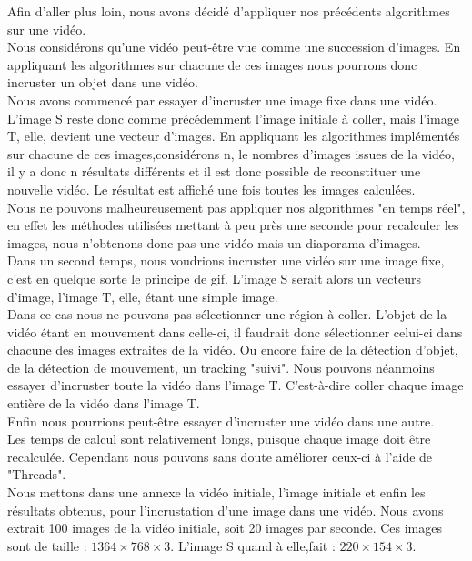 Afin d'aller plus loin, nous avons décidé d'appliquer nos précédents algorithmes sur une vidéo. \\
Nous considérons qu'une vidéo peut-être vue comme une succession d'images. En appliquant les algorithmes sur chacune de ces images nous pourrons donc incruster un objet dans une vidéo. \\
Nous avons commencé par essayer d'incruster une image fixe dans une vidéo. 
L'image S reste donc comme précédemment l'image initiale à coller, mais l'image T, elle, devient une vecteur d'images. En appliquant les algorithmes implémentés sur chacune de ces images,considérons n, le nombres d'images issues de la vidéo, il y a donc n résultats différents et il est donc possible de reconstituer une nouvelle vidéo.  Le résultat est affiché une fois toutes les images calculées. \\ Nous ne pouvons malheureusement pas appliquer nos algorithmes "en temps réel", en effet les méthodes utilisées mettant à peu près une seconde pour recalculer les images, nous n'obtenons donc pas une vidéo mais un diaporama d'images. \\
Dans un second temps, nous voudrions incruster une vidéo sur une image fixe, c'est en quelque sorte le principe de gif. L'image S serait alors un vecteurs d'image, l'image T, elle, étant une simple image. \\ Dans ce cas nous ne pouvons pas sélectionner une région à coller. L'objet de la vidéo étant en mouvement dans celle-ci, il faudrait donc sélectionner celui-ci dans chacune des images extraites de la vidéo. Ou encore faire de la détection d'objet, de la détection de mouvement, un tracking "suivi". Nous pouvons néanmoins essayer d'incruster toute la vidéo dans l'image T.  C'est-à-dire coller chaque image entière de la vidéo dans l'image T.\\
Enfin nous pourrions peut-être essayer d'incruster une vidéo dans une autre. \\
Les temps de calcul sont relativement longs, puisque chaque image doit être recalculée. Cependant nous pouvons sans doute améliorer ceux-ci à l'aide de "Threads". \\
Nous mettons dans une annexe la vidéo initiale, l'image initiale et enfin les résultats obtenus, pour l'incrustation d'une image dans une vidéo. 
Nous avons extrait 100 images de la vidéo initiale, soit 20 images par seconde. Ces images sont de taille : $1364 \times 768 \times 3$.  L'image S quand à elle,fait : $220 \times 154 \times 3$.